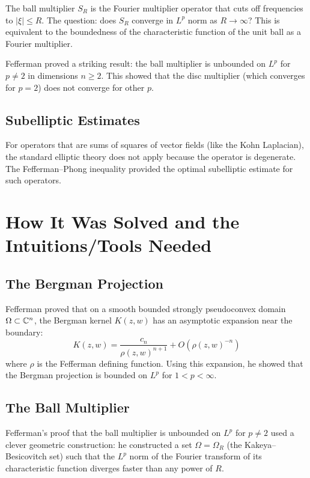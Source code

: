 The ball multiplier $S_R$ is the Fourier multiplier operator that cuts off frequencies to $|\xi| \leq R$. The question: does $S_R$ converge in $L^p$ norm as $R \to \infty$? This is equivalent to the boundedness of the characteristic function of the unit ball as a Fourier multiplier.

Fefferman proved a striking result: the ball multiplier is unbounded on $L^p$ for $p \neq 2$ in dimensions $n \geq 2$. This showed that the disc multiplier (which converges for $p=2$) does not converge for other $p$.

\subsection{Subelliptic Estimates}

For operators that are sums of squares of vector fields (like the Kohn Laplacian), the standard elliptic theory does not apply because the operator is degenerate. The Fefferman--Phong inequality provided the optimal subelliptic estimate for such operators.

\section{How It Was Solved and the Intuitions/Tools Needed}

\subsection{The Bergman Projection}

Fefferman proved that on a smooth bounded strongly pseudoconvex domain $\Omega \subset \mathbb{C}^n$, the Bergman kernel $K(z,w)$ has an asymptotic expansion near the boundary:
\[
K(z,w) = \frac{c_n}{\rho(z,w)^{n+1}} + O(\rho(z,w)^{-n})
\]
where $\rho$ is the Fefferman defining function. Using this expansion, he showed that the Bergman projection is bounded on $L^p$ for $1 < p < \infty$.

\subsection{The Ball Multiplier}

Fefferman's proof that the ball multiplier is unbounded on $L^p$ for $p \neq 2$ used a clever geometric construction: he constructed a set $\Omega = \Omega_R$ (the Kakeya--Besicovitch set) such that the $L^p$ norm of the Fourier transform of its characteristic function diverges faster than any power of $R$.

